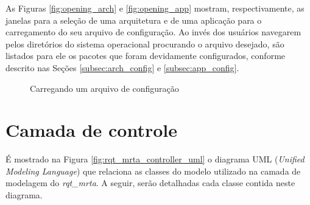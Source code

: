        As Figuras \ref{fig:opening_arch} e \ref{fig:opening_app} mostram, respectivamente, as janelas para a seleção de uma arquitetura e de uma aplicação para o carregamento do seu arquivo de configuração. Ao invés dos usuários navegarem pelos diretórios do sistema operacional procurando o arquivo desejado, são listados para ele os pacotes que foram devidamente configurados, conforme descrito nas Seções \ref{subsec:arch_config} e \ref{subsec:app_config}.
        
        \begin{figure}[htb]
            \centering
            \caption{Carregando um arquivo de configuração} \label{fig:opening_config}
        \end{figure}
        
    \section{Camada de controle} \label{subset:rqt_mrta_controller}
        É mostrado na Figura \ref{fig:rqt_mrta_controller_uml} o diagrama UML (\textit{Unified Modeling Language}) que relaciona as classes do modelo utilizado na camada de modelagem do \textit{rqt\_mrta}. A seguir, serão detalhadas cada classe contida neste diagrama.
        
